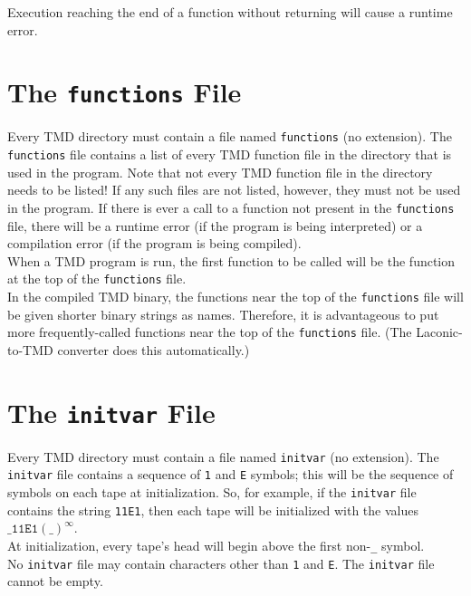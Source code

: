 \documentclass[11pt]{article}
\begin{document}
Execution reaching the end of a function without returning will cause a runtime error. \\

\section{The \texttt{functions} File}

Every TMD directory must contain a file named \texttt{functions} (no extension). The \texttt{functions} file contains a list of every TMD function file in the directory that is used in the program. Note that not every TMD function file in the directory needs to be listed! If any such files are not listed, however, they must not be used in the program. If there is ever a call to a function not present in the \texttt{functions} file, there will be a runtime error (if the program is being interpreted) or a compilation error (if the program is being compiled). \\

When a TMD program is run, the first function to be called will be the function at the top of the \texttt{functions} file. \\

In the compiled TMD binary, the functions near the top of the \texttt{functions} file will be given shorter binary strings as names. Therefore, it is advantageous to put more frequently-called functions near the top of the \texttt{functions} file. (The Laconic-to-TMD converter does this automatically.)

\section{The \texttt{initvar} File}

Every TMD directory must contain a file named \texttt{initvar} (no extension). The \texttt{initvar} file contains a sequence of \texttt{1} and \texttt{E} symbols; this will be the sequence of symbols on each tape at initialization. So, for example, if the \texttt{initvar} file contains the string \texttt{11E1}, then each tape will be initialized with the values $\texttt{\_11E1}(\texttt{\_})^{\infty}$. \\

At initialization, every tape's head will begin above the first non-\texttt{\_} symbol. \\

No \texttt{initvar} file may contain characters other than \texttt{1} and \texttt{E}. The \texttt{initvar} file cannot be empty.
\end{document}
